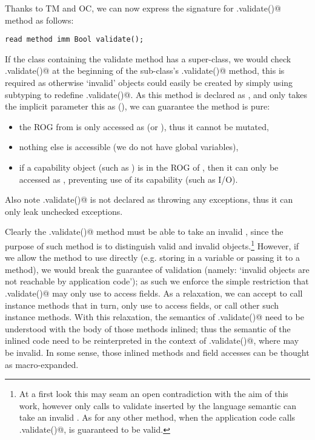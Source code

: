 Thanks to TM and OC, we can now express the signature for \Q@.validate()@ method as follows:
\saveSpace
\begin{lstlisting}
read method imm Bool validate();
\end{lstlisting}
\saveSpace
If the class containing the validate method has a super-class, we would check \Q@super.validate()@ at the beginning of the sub-class’s \Q@.validate()@ method, this is required as otherwise `invalid' objects could easily be created by simply using subtyping to redefine \Q@.validate()@.
As this method is declared as \Q@read@, and only takes the implicit parameter this as (\Q@read@), we can guarantee the method is pure:
\begin{itemize}
\item the ROG from \Q@this@ is only accessed as \Q@read@ (or \Q@imm@), thus it cannot be mutated,
\item nothing else is accessible (we do not have global variables),
\item if a capability object (such as \Q@System@) is in the ROG of \Q@this@, then it can only be accessed as \Q@read@, preventing use of its capability (such as I/O).
\end{itemize}

\noindent Also note \Q@.validate()@ is not declared as throwing any exceptions, thus it can only leak unchecked exceptions.


Clearly the \Q@.validate()@ method must be able to take an invalid \Q@this@, since the purpose of such method is to distinguish valid and invalid objects.\footnote{
At a first look this may seam an open contradiction
with the aim of this work, however only calls to validate inserted by the language semantic can take an invalid \Q@this@. As for any other method, when the application code calls \Q@.validate()@,
\Q@this@ is guaranteed to be valid.
} However, if we allow the method to use \Q@this@ directly (e.g. storing in a variable or passing it to a method), we would break the guarantee of validation (namely: `invalid objects are not reachable by application code'); as such we enforce the simple restriction that \Q@.validate()@ may only use \Q@this@ to access fields.
As a relaxation, we can accept to call instance methods that in turn, only use \Q@this@ to access fields, or call other such instance methods. With this relaxation, the semantics of \Q@.validate()@ need to be understood with the body of those methods inlined; thus the semantic of the inlined code need to be reinterpreted in the context of \Q@.validate()@, where \Q@this@ may be invalid.
In some sense, those inlined methods and field accesses can be thought as macro-expanded.


